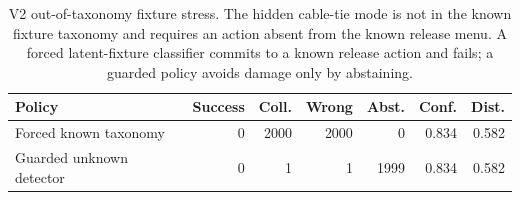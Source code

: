 \begin{table}[h]
\centering
\small
\begin{tabular}{lrrrrrr}
\toprule
Policy & Success & Coll. & Wrong & Abst. & Conf. & Dist. \\
\midrule
Forced known taxonomy & 0 & 2000 & 2000 & 0 & 0.834 & 0.582 \\
Guarded unknown detector & 0 & 1 & 1 & 1999 & 0.834 & 0.582 \\
\bottomrule
\end{tabular}
\caption{V2 out-of-taxonomy fixture stress. The hidden cable-tie mode is not in the known fixture taxonomy and requires an action absent from the known release menu. A forced latent-fixture classifier commits to a known release action and fails; a guarded policy avoids damage only by abstaining.}
\label{tab:unknown-fixture-stress}
\end{table}

